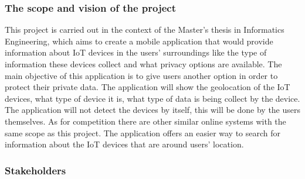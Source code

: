 \subsubsection*{The scope and vision of the project}

This project is carried out in the context of the Master's thesis in Informatics
Engineering, which aims to create a mobile application that would provide
information about IoT devices in the users' surroundings like the type of information
these devices collect and what privacy options are available. The main objective
of this application is to give users another option in order to protect
their private data. The application will show the geolocation of the IoT
devices, what type of device it is, what type of data is being collect by
the device. The application will not detect the devices by itself, this will
be done by the users themselves. As for competition there are other similar
online systems with the same scope as this project. The application offers
an easier way to search for information about the IoT devices that are around users'
location.

\subsubsection*{Stakeholders}

